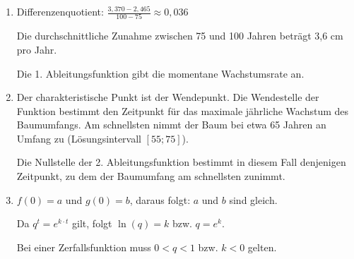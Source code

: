 \begin{langesbeispiel}
{\begin{enumerate}
	$\rightarrow$ (näherungsweise) $f(t)=0,17\cdot 1,0408^t$ bzw. $f(t)=0,17\cdot e^{0,04\cdot t}$ da $\ln(1,0408)\approx 0,04$
	
	Begründung dafür, dass das Modell für die nächsten 25 Jahre nicht passend ist: Nach dem Modell gilt $f(75)=0,17\cdot 1,0408^{75}\approx 3,412$. Dieser Wert weicht signifikant vom gemessen Wert ab und spricht daher gegen eine Verwendung des exponentiellen Modells in den nächsten 25 Jahren.
	
	\item Differenzenquotient: $\frac{3,370-2,465}{100-75}\approx 0,036$
	
	Die durchschnittliche Zunahme zwischen 75 und 100 Jahren beträgt 3,6 cm pro Jahr. 
	
	Die 1. Ableitungsfunktion gibt die momentane Wachstumsrate an.
	
	\item Der charakteristische Punkt ist der Wendepunkt. Die Wendestelle der Funktion bestimmt den Zeitpunkt für das maximale jährliche Wachstum des Baumumfangs. Am schnellsten nimmt der Baum bei etwa 65 Jahren an Umfang zu (Lösungsintervall $[55;75]$).
	
	Die Nullstelle der 2. Ableitungsfunktion bestimmt in diesem Fall denjenigen Zeitpunkt, zu dem der Baumumfang am schnellsten zunimmt.
	
	\item $f(0)=a$ und $g(0)=b$, daraus folgt: $a$ und $b$ sind gleich.
	
	Da $q^t=e^{k\cdot t}$ gilt, folgt $\ln(q)=k$ bzw. $q=e^k$.
	
	Bei einer Zerfallsfunktion muss $0<q<1$ bzw. $k<0$ gelten.
	\end{enumerate}}
\end{langesbeispiel}
